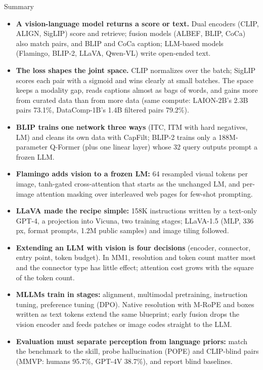 \begin{frame}{Summary}
  \begin{itemize}\scriptsize\itemsep0.25em
    \item \textbf{A vision-language model returns a score or text.} Dual encoders (CLIP, ALIGN, SigLIP) score and retrieve; fusion models (ALBEF, BLIP, CoCa) also match pairs, and BLIP and CoCa caption; LLM-based models (Flamingo, BLIP-2, LLaVA, Qwen-VL) write open-ended text.
    \item \textbf{The loss shapes the joint space.} CLIP normalizes over the batch; SigLIP scores each pair with a sigmoid and wins clearly at small batches. The space keeps a modality gap, reads captions almost as bags of words, and gains more from curated data than from more data (same compute: LAION-2B's 2.3B pairs 73.1\%, DataComp-1B's 1.4B filtered pairs 79.2\%).
    \item \textbf{BLIP trains one network three ways} (ITC, ITM with hard negatives, LM) and cleans its own data with CapFilt; BLIP-2 trains only a 188M-parameter Q-Former (plus one linear layer) whose 32 query outputs prompt a frozen LLM.
    \item \textbf{Flamingo adds vision to a frozen LM:} 64 resampled visual tokens per image, tanh-gated cross-attention that starts as the unchanged LM, and per-image attention masking over interleaved web pages for few-shot prompting.
    \item \textbf{LLaVA made the recipe simple:} 158K instructions written by a text-only GPT-4, a projection into Vicuna, two training stages; LLaVA-1.5 (MLP, 336 px, format prompts, 1.2M public samples) and image tiling followed.
    \item \textbf{Extending an LLM with vision is four decisions} (encoder, connector, entry point, token budget). In MM1, resolution and token count matter most and the connector type has little effect; attention cost grows with the square of the token count.
    \item \textbf{MLLMs train in stages:} alignment, multimodal pretraining, instruction tuning, preference tuning (DPO). Native resolution with M-RoPE and boxes written as text tokens extend the same blueprint; early fusion drops the vision encoder and feeds patches or image codes straight to the LLM.
    \item \textbf{Evaluation must separate perception from language priors:} match the benchmark to the skill, probe hallucination (POPE) and CLIP-blind pairs (MMVP: humans 95.7\%, GPT-4V 38.7\%), and report blind baselines.
  \end{itemize}
\end{frame}
